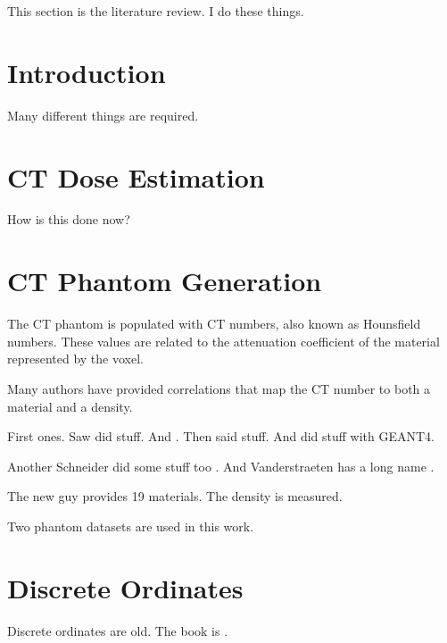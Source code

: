 


This section is the literature review. I do these things.

\section{Introduction}
Many different things are required.

\section{CT Dose Estimation}
How is this done now?

\section{CT Phantom Generation}
The CT phantom is populated with CT numbers, also known as Hounsfield numbers. These values are related to the attenuation coefficient of the material represented by the voxel.

Many authors have provided correlations that map the CT number to both a material and a density.

First ones.
Saw \citep{ref:sawc} did stuff. And \citep{ref:plessisf}. Then \citet{ref:schneideru} said stuff. And \citet{ref:kimh} did stuff with GEANT4.

Another Schneider did some stuff too \citep{ref:schneiderw}. And Vanderstraeten has a long name \citep{ref:vanderstraetenb}.

The new guy provides 19 materials. The density is measured.

Two phantom datasets are used in this work.

\section{Discrete Ordinates}
Discrete ordinates are old. The book is \citet{ref:lewise}.

